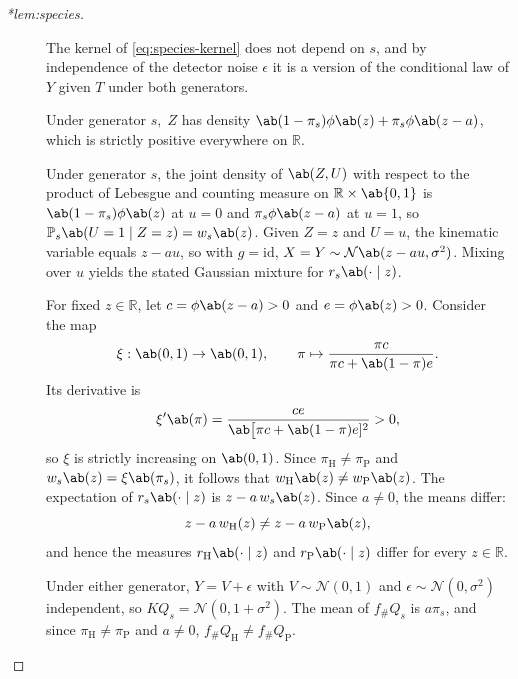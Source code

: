 \documentclass[12pt]{article}
\newcommand{\Herwig}{\mathrm{H}}
\newcommand{\Pythia}{\mathrm{P}}
\newcommand{\Prb}{\mathbb{P}}
\newcommand{\Normal}{\mathcal{N}}
\newcommand{\1}{\mathbbm{1}}
\newcommand{\pushf}[1]{#1_{\#}}
\renewcommand{\[}{\begin{equation}}
\renewcommand{\]}{\end{equation}}
\begin{document}
 \begin{proof}[*lem:species]
        \begin{description}
            \item[] The kernel of \cref{eq:species-kernel} does not depend on \(s\), and by independence of the detector noise \(\epsilon\) it is a version of the conditional law of \(Y\) given \(T\) under both generators.
            \item[] Under generator \(s,\;Z\) has density \( \ab( 1-\pi_s ) \phi \ab(z) + \pi_s \phi \ab(z-a)\), which is strictly positive everywhere on \(\mathbb R\).
            \item[] Under generator \(s\), the joint density of \(\ab(Z,U)\) with respect to the product of Lebesgue and counting measure on \(\mathbb R \times \ab\{0,1\}\) is \( \ab( 1 - \pi_s ) \phi \ab(z) \) at \(u=0\) and \( \pi_s \phi \ab(z-a) \) at \(u=1\), so \( \Prb_s \ab(U=1\mid Z=z) = w_s \ab(z) \).
            Given \(Z=z\) and \(U=u\), the kinematic variable equals \(z-au\), so with \(g = \mathrm{id}\), \(X = Y \sim \Normal \ab( z - au, \sigma^2) \).
            Mixing over \(u\) yields the stated Gaussian mixture for \(r_s \ab( \cdot \mid z ) \).
            
            For fixed \(z\in\mathbb R\), let \(c = \phi \ab(z-a) > 0\) and \(e = \phi \ab(z) > 0\). Consider the map
            \[
                \xi : \ab(0,1) \to \ab(0,1), \qquad \pi \mapsto \frac{\pi c}{\pi c + \ab(1 - \pi) e}.
            \]
            Its derivative is
            \[
                \xi' \ab(\pi) = \frac{ce}{\ab\big[\pi c + \ab(1 - \pi) e]^2} > 0,
            \]
            so \(\xi\) is strictly increasing on \(\ab(0,1)\).
            Since \(\pi_\Herwig \ne \pi_\Pythia\) and \( w_s \ab( z ) = \xi \ab(\pi_s)\), it follows that \(w_\Herwig \ab( z ) \ne w_\Pythia \ab(z)\).
            The expectation of \(r_s \ab( \cdot \mid z)\) is \(z - a \, w_s \ab(z)\). Since \(a\ne0\), the means differ:
            \[
                z - a\,w_\Herwig(z) \ne z - a \, w_\Pythia \ab(z),
            \]
            and hence the measures \(r_\Herwig \ab(\cdot\mid z) \) and \(r_\Pythia \ab(\cdot\mid z) \) differ for every \(z\in\mathbb R\).
            
            \item[] Under either generator, \(Y = V + \epsilon \) with \(V\sim\Normal(0,1)\) and \( \epsilon \sim \Normal( 0,\sigma^2 )\) independent, so \( KQ_s = \Normal( 0, 1+\sigma^2 ) \).
            The mean of \(\pushf fQ_s\) is \(a\pi_s\), and since \(\pi_\Herwig \ne \pi_\Pythia\) and \(a \ne 0\), \(\pushf fQ_\Herwig \ne \pushf fQ_\Pythia\).
        \end{description}
    \end{proof}
\end{document}
